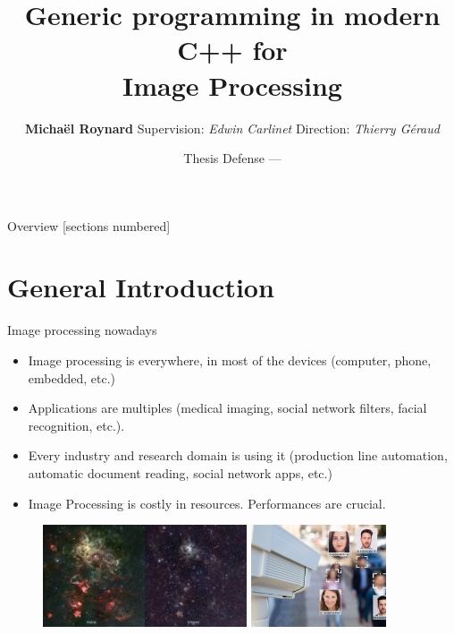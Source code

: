 \documentclass[12pt,aspectratio=169]{beamer}
\title{Generic programming in modern C++ for\\ Image Processing}
\date{Thesis Defense --- \displaydate{dateSoutenance}}
\author{\textbf{Michaël Roynard} \hspace{1cm} Supervision: \emph{Edwin Carlinet} \hspace{1cm} Direction: \emph{Thierry
Géraud}}
\institute{EPITA Research Laboratory (LRE) --- Le Kremlin Bicêtre, France}
\begin{document}
\maketitle

\begin{frame}{Overview}
  [sections numbered]
  \tableofcontents[hideallsubsections]
\end{frame}

%
%
%

\section[General Introduction]{General Introduction}

\begin{frame}[fragile]{Image processing nowadays}
  \begin{itemize}
    \item Image processing is everywhere, in most of the devices (computer, phone, embedded, etc.)
    \item Applications are multiples (medical imaging, social network filters, facial recognition, etc.).
    \item Every industry and research domain is using it (production line automation, automatic document reading, social network apps, etc.)
    \item Image Processing is costly in resources. Performances are crucial.
  \end{itemize}
  \begin{figure}[bl]
    \hfill
    \includegraphics[height=3cm]{../illustrations/rgb_infrared.pdf}
    \hfill
    \includegraphics[height=3cm]{../illustrations/camera.pdf}
    \hspace{1cm}
  \end{figure}
\end{frame}
\end{document}
